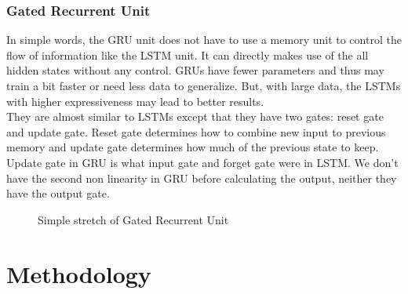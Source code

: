 \documentclass[12pt,a4paper]{report}
\begin{document}
\subsection{Gated Recurrent Unit}
In simple words, the GRU unit does not have to use a memory unit to control the flow of information like the LSTM unit. It can directly makes use of the all hidden states without any control. GRUs have fewer parameters and thus may train a bit faster or need less data to generalize. But, with large data, the LSTMs with higher expressiveness may lead to better results.\\
They are almost similar to LSTMs except that they have two gates: reset gate and update gate. Reset gate determines how to combine new input to previous memory and update gate determines how much of the previous state to keep. Update gate in GRU is what input gate and forget gate were in LSTM. We don't have the second non linearity in GRU before calculating the output, neither they have the output gate.
\begin{figure}[H]
  \centering
  \caption{Simple stretch of Gated Recurrent Unit\cite{LSTM}}
\end{figure}





\clearpage

\chapter{Methodology}
\end{document}
